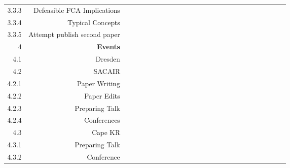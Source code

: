 \begin{table}[!ht]
{\begin{tabular}{rrlllllllllllllllllll}
            3.3.3 & Defeasible FCA Implications    & ~     & ~     & ~     & ~     & ~      & ~         & ~     & ~     & ~     \\
            3.3.4 & Typical Concepts               & ~     & ~     & ~     & ~     & ~      & ~         & ~     & ~     & ~     \\
            3.3.5 & Attempt publish second paper   & ~     & ~     & ~     & ~     & ~      & ~         & ~     & ~     & ~     \\
            4     & \textbf{Events}                & ~     & ~     & ~     & ~     & ~      & ~         & ~     & ~     & ~     \\
            4.1   & Dresden                        & ~     & ~     & ~     & ~     & ~      & ~         & ~     & ~     & ~     \\
            4.2   & SACAIR                         & ~     & ~     & ~     & ~     & ~      & ~         & ~     & ~     & ~     \\
            4.2.1 & Paper Writing                  & ~     & ~     & ~     & ~     & ~      & ~         & ~     & ~     & ~     \\
            4.2.2 & Paper Edits                    & ~     & ~     & ~     & ~     & ~      & ~         & ~     & ~     & ~     \\
            4.2.3 & Preparing Talk                 & ~     & ~     & ~     & ~     & ~      & ~         & ~     & ~     & ~     \\
            4.2.4 & Conferences                    & ~     & ~     & ~     & ~     & ~      & ~         & ~     & ~     & ~     \\
            4.3   & Cape KR                        & ~     & ~     & ~     & ~     & ~      & ~         & ~     & ~     & ~     \\
            4.3.1 & Preparing Talk                 & ~     & ~     & ~     & ~     & ~      & ~         & ~     & ~     & ~     \\
            4.3.2 & Conference                     & ~     & ~     & ~     & ~     & ~      & ~         & ~     & ~     & ~     \\
        \end{tabular} }
\end{table}
